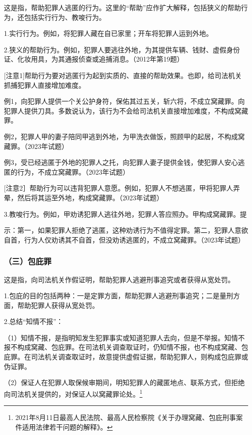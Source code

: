 这是指，帮助犯罪人逃匿的行为。这里的“帮助”应作扩大解释，包括狭义的帮助行为，还包括实行行为、教唆行为。

1.实行行为。例如，将犯罪人藏在自已家里；开车将犯罪人运到外地。

2.狭义的帮助行为。例如，犯罪人要逃往外地，为其提供车辆、钱财、虚假身份证、化妆用具，为其通报侦查或追捕消息。（2012年第19题）

[注意1]帮助行为要对逃匿行为起到实质的、直接的帮助效果。也即，给司法机关抓捕犯罪人直接增加难度。

例1，向犯罪人提供一个关公护身符，保佑其过五关，斩六将，不成立窝藏罪。向犯罪人提供刀具。多数说认为，该行为不会给司法机关直接增加难度，不构成窝藏罪。

例2，犯罪人甲的妻子陪同甲逃到外地，为甲洗衣做饭，照顾甲的起居，不构成窝藏罪。（2023年试题）

例3，受已经逃匿于外地的犯罪人之托，向犯罪人妻子提供金钱，使犯罪人安心逃匿的行为，不成立窝藏罪。（2023年试题）

[注意2］帮助行为可以违背犯罪人意愿。例如，犯罪人不想逃匿，甲将犯罪人弄晕，然后将其运至外地，构成窝藏罪。（2023年试题）

3.教唆行为。例如，甲劝诱犯罪人逃往外地，犯罪人答应照办。甲构成窝藏罪。提

示：第一，如果犯罪人拒绝了逃匿，这种劝诱行为不值得定罪。第二，犯罪人意欲自首，行为人仅劝诱其不自首，但没劝诱逃匿的，不成立窝藏罪。（2023年试题）

\subsubsection*{（三）包庇罪}

这是指，向司法机关作假证明，帮助犯罪人逃避刑事追究或者获得从宽处罚。

1.包庇的目的包括两种：一是定罪方面，帮助犯罪人逃避刑事追究；二是量刑方面，帮助犯罪人获得从宽处罚。

2.总结“知情不报”：

（1）知情不报，是指明知发生犯罪事实或知道犯罪人去向，但是不举报。知情不报不构成窝藏、包庇罪。在司法机关调查取证时，仍知情不报，也不构成窝藏、包庇罪。在司法机关调查取证时，故意提供虚假证据，帮助犯罪人，则构成包庇罪或伪证罪。

（2）保证人在犯罪人取保候审期间，明知犯罪人的藏匿地点、联系方式，但拒绝向司法机关提供的，对保证人以窝藏罪论处。\footnote{2021年8月11日最高人民法院、最高人民检察院《关于办理窝藏、包庇刑事案件适用法律若干问题的解释》。}

